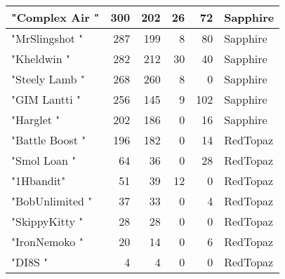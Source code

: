 \documentclass{article}
\begin{document}
\begin{table}[htbp]
\begin{tabular}{|l|r|r|r|r|l|}
"Complex Air " & 300 & 202 & 26 & 72 & Sapphire \\ \hline
"MrSlingshot " & 287 & 199 & 8 & 80 & Sapphire \\ \hline
"Kheldwin " & 282 & 212 & 30 & 40 & Sapphire \\ \hline
"Steely Lamb " & 268 & 260 & 8 & 0 & Sapphire \\ \hline
"GIM Lantti " & 256 & 145 & 9 & 102 & Sapphire \\ \hline
"Harglet " & 202 & 186 & 0 & 16 & Sapphire \\ \hline
"Battle Boost " & 196 & 182 & 0 & 14 & RedTopaz \\ \hline
"Smol Loan " & 64 & 36 & 0 & 28 & RedTopaz \\ \hline
"1Hbandit" & 51 & 39 & 12 & 0 & RedTopaz \\ \hline
"BobUnlimited " & 37 & 33 & 0 & 4 & RedTopaz \\ \hline
"SkippyKitty " & 28 & 28 & 0 & 0 & RedTopaz \\ \hline
"IronNemoko " & 20 & 14 & 0 & 6 & RedTopaz \\ \hline
"DI8S " & 4 & 4 & 0 & 0 & RedTopaz \\ \hline
\end{tabular}
\end{table}
\end{document}
